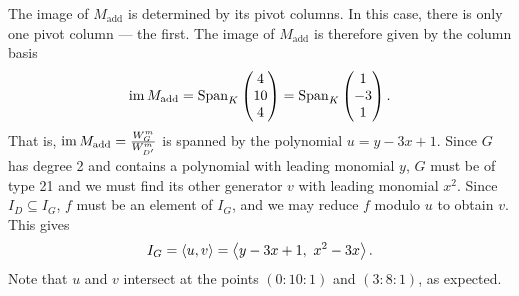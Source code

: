 The image of $M_{\text{add}}$ is determined by its pivot columns.
In this case, there is only one pivot column --- the first.
The image of $M_{\text{add}}$ is therefore given by the column basis
\[ \operatorname{im} M_{\text{add}} = \operatorname{Span}_K \begin{pmatrix} 4 \\ 10 \\ 4 \end{pmatrix}
         = \operatorname{Span}_K \begin{pmatrix} 1 \\ -3 \\ 1 \end{pmatrix}. \]
That is, $\operatorname{im} M_{\text{add}} = \frac {W_G^m}{W_{D'}^m}$ is spanned by the polynomial $u = y - 3x + 1$.
Since $G$ has degree 2 and contains a polynomial with leading monomial $y$,
$G$ must be of type 21 and we must find its other generator $v$ with leading monomial $x^2$.
Since $I_D \subseteq I_G$, $f$ must be an element of $I_G$, and we may reduce $f$ modulo $u$ to obtain $v$.
This gives
  \[ I_G = \left\langle u,v \right\rangle = \left\langle y - 3x + 1, ~x^2 - 3x \right\rangle. \]
Note that $u$ and $v$ intersect at the points $(0 : 10 : 1)$ and $(3 : 8 : 1)$, as expected.
